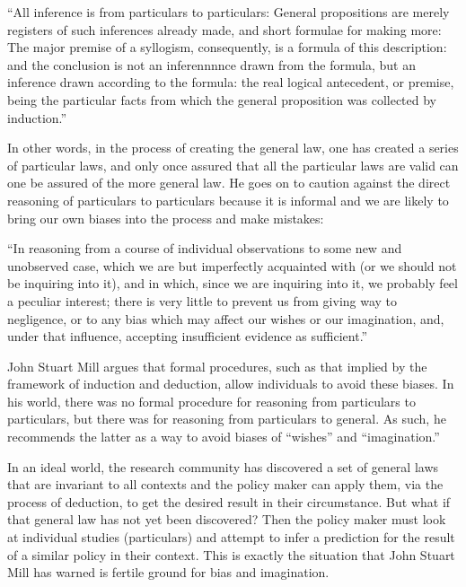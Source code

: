 \documentclass[a4paper,12pt]{article}
\begin{document}
\begin{displayquote}
  ``All inference is from particulars to particulars: General propositions are merely registers of such inferences already made, and short formulae for making more: The major premise of a syllogism, consequently, is a formula of this description: and the conclusion is not an inferennnnce drawn from the formula, but an inference drawn according to the formula: the real logical antecedent, or premise, being the particular facts from which the general proposition was collected by induction.''  \parencite{mill1884}
\end{displayquote}

In other words, in the process of creating the general law, one has created a series of particular laws, and only once assured that all the particular laws are valid can one be assured of the more general law. He goes on to caution against the direct reasoning of particulars to particulars because it is informal and we are likely to bring our own biases into the process and make mistakes:
%
\begin{displayquote}
``In reasoning from a course of individual observations to some new and unobserved case, which we are but imperfectly acquainted with (or we should not be inquiring into it), and in which, since we are inquiring into it, we probably feel a peculiar interest; there is very little to prevent us from giving way to negligence, or to any bias which may affect our wishes or our imagination, and, under that influence, accepting insufficient evidence as sufficient.'' \parencite{mill1884}
\end{displayquote}

John Stuart Mill argues that formal procedures, such as that implied by the framework of induction and deduction, allow individuals to avoid these biases. In his world, there was no formal procedure for reasoning from particulars to particulars, but there was for reasoning from particulars to general. As such, he recommends the latter as a way to avoid biases of ``wishes'' and ``imagination.''

In an ideal world, the research community has discovered a set of general laws that are invariant to all contexts and the policy maker can apply them, via the process of deduction, to get the desired result in their circumstance. But what if that general law has not yet been discovered? Then the policy maker must look at individual studies (particulars) and attempt to infer a prediction for the result of a similar policy in their context. This is exactly the situation that John Stuart Mill has warned is fertile ground for bias and imagination.
\end{document}
